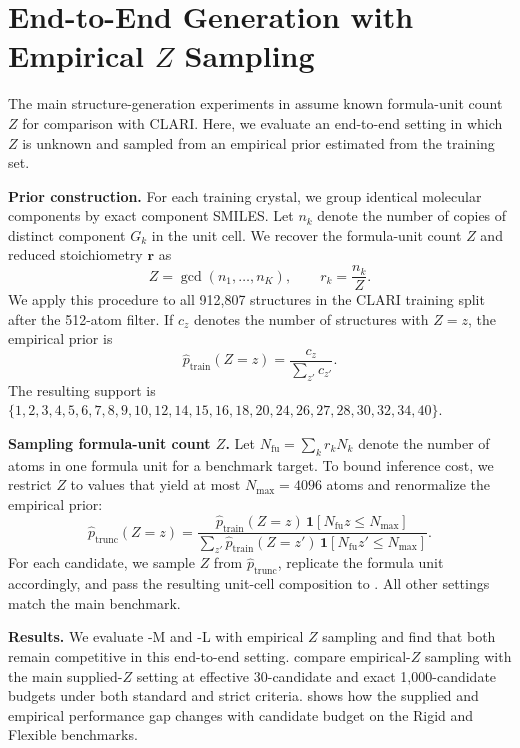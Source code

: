 \section{End-to-End Generation with Empirical \texorpdfstring{$Z$}{Z} Sampling}
\label{app:empirical-unit-cell-z}

The main structure-generation experiments in  assume known formula-unit count $Z$ for comparison with CLARI. Here, we evaluate an end-to-end setting in which $Z$ is unknown and sampled from an empirical prior estimated from the training set.

\textbf{Prior construction.}
For each training crystal, we group identical molecular components by exact
component SMILES. Let $n_k$ denote the number of copies of distinct component
$G_k$ in the unit cell. We recover the formula-unit count $Z$ and reduced
stoichiometry $\mathbf r$ as
\begin{equation*}
Z=\gcd(n_1,\ldots,n_K),
\qquad
r_k=\frac{n_k}{Z}.
\end{equation*}
We apply this procedure to all 912{,}807 structures in the CLARI training split
after the 512-atom filter. If $c_z$ denotes the number of structures with
$Z=z$, the empirical prior is
\begin{equation*}
\widehat p_{\mathrm{train}}(Z=z)
=\frac{c_z}{\sum_{z'}c_{z'}}.
\end{equation*}
The resulting support is
$\{1,2,3,4,5,6,7,8,9,10,12,14,15,16,18,20,24,26,27,28,30,32,34,40\}$.

\textbf{Sampling formula-unit count $Z$.}
Let $N_{\mathrm{fu}}=\sum_k r_kN_k$ denote the number of atoms in one formula
unit for a benchmark target. To bound inference cost, we restrict $Z$ to values
that yield at most $N_{\max}=4096$ atoms and renormalize the empirical prior:
\begin{equation*}
\widehat p_{\mathrm{trunc}}(Z=z)
=
\frac{\widehat p_{\mathrm{train}}(Z=z)
\,\mathbf{1}[N_{\mathrm{fu}}z\leq N_{\max}]}
{\sum_{z'}\widehat p_{\mathrm{train}}(Z=z')
\,\mathbf{1}[N_{\mathrm{fu}}z'\leq N_{\max}]}.
\end{equation*}
For each candidate, we sample $Z$ from $\widehat p_{\mathrm{trunc}}$, replicate the formula unit accordingly, and pass the resulting unit-cell composition to \model{}. All other settings match the main benchmark.

\textbf{Results.}
We evaluate \model{}-M and \model{}-L with empirical $Z$ sampling and find that
both remain competitive in this end-to-end setting.
compare empirical-$Z$ sampling with the main supplied-$Z$ setting at effective
30-candidate and exact 1{,}000-candidate budgets under both standard and strict
criteria.  shows how the
supplied and empirical performance gap changes with candidate budget on the Rigid and Flexible benchmarks.










